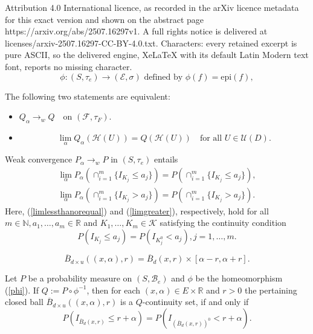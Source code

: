 \documentclass[10pt,a4paper]{amsart}
\begin{document}
Attribution 4.0 International licence, as recorded in the arXiv licence metadata for this exact version and shown on the abstract page https://arxiv.org/abs/2507.16297v1. A full rights notice is delivered at licenses/arxiv-2507.16297-CC-BY-4.0.txt. Characters: every retained excerpt is pure ASCII, so the delivered engine, XeLaTeX with its default Latin Modern text font, reports no missing character.
\begin{equation} \label{phi}
\phi:(S,\tau_e) \rightarrow (\mathcal{E},\sigma) \text{ defined by } \phi(f)=\text{epi}(f),
\end{equation}

\begin{theorem} \label{UD} The following two statements are equivalent:
\begin{itemize}
\item[(1)] $Q_\alpha \longrightarrow_w Q \quad \text{on } (\mathcal{F},\tau_F).$
\item[(2)]
\begin{equation} \label{convergencedeterminingclass}
 \lim_\alpha Q_\alpha(\mathcal{H}(U))=Q(\mathcal{H}(U)) \quad \text{for all }  U \in \mathcal{U}(D).
\end{equation}
\end{itemize}
\end{theorem}

\begin{proposition} \label{necessary} Weak convergence $P_\alpha \rightarrow_w P$ in $(S,\tau_e)$ entails
\begin{align}
 \lim_\alpha P_\alpha(\cap_{i=1}^m \{I_{K_j} \le a_j\}) = P(\cap_{i=1}^m \{I_{K_j} \le a_j\}), \label{limlessthanorequal} \\
 \lim_\alpha P_\alpha(\cap_{i=1}^m \{I_{K_j} > a_j\}) = P(\cap_{i=1}^m \{I_{K_j} > a_j\}). \label{limgreater}
\end{align}
Here, (\ref{limlessthanorequal}) and (\ref{limgreater}), respectively, hold for all $m \in \mathbb{N}, a_1,\ldots,a_m \in \mathbb{R}$ and
$K_1,\ldots,K_m \in \mathcal{K}$ satisfying the continuity condition
$$
  P(I_{K_j} \le a_j)=P(I_{K_j^0} < a_j), j=1,\ldots,m.
$$
\end{proposition}

\begin{equation} \label{closedballisclosedrectangle}
\overline{B}_{d \times u}((x,\alpha),r)= \overline{B}_d(x,r) \times [\alpha-r,\alpha+r].
\end{equation}

\begin{lemma} \label{continuityset} Let $P$ be a probability measure on $(S,\mathcal{B}_e)$ and $\phi$ be the homeomorphism (\ref{phi}). If $Q:= P \circ \phi^{-1}$, then for each $(x,\alpha) \in E \times \mathbb{R}$ and $r>0$ the pertaining closed ball
$\overline{B}_{d \times u}((x,\alpha),r)$ is a $Q$-continuity set, if and only if
$$
 P( I_{\overline{B}_d(x,r)} \le r+\alpha) = P( I_{(\overline{B}_d(x,r))^0} < r+\alpha).
$$
\end{lemma}
\end{document}
